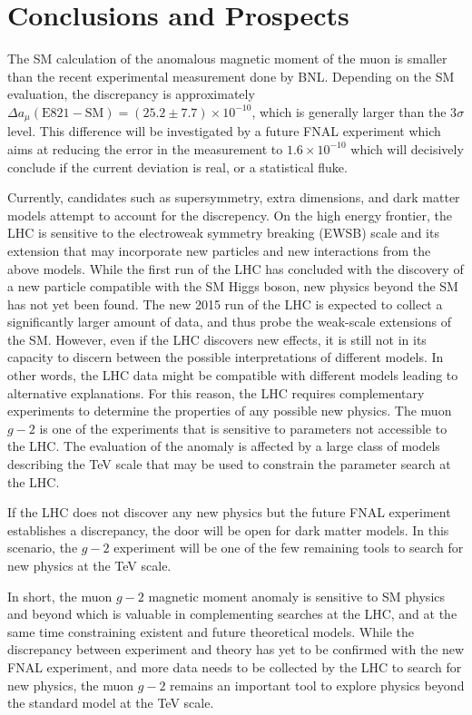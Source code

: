 \documentclass{outhesis}
\begin{document}
\section{Conclusions and Prospects}
\label{fut}
The SM calculation of the anomalous magnetic moment of the muon is smaller than the recent experimental measurement done by BNL. Depending on the SM evaluation, the discrepancy is approximately $\Delta a_{\mu} \left(\text{E821} - \text{SM}\right) = \left(25.2\pm7.7\right)\times 10^{-10}$, which is generally larger than the 3$\sigma$ level. This difference will be investigated by a future FNAL experiment which aims at reducing the error in the measurement to $1.6\times10^{-10}$ which will decisively conclude if the current deviation is real, or a statistical fluke. 

Currently, candidates such as supersymmetry, extra dimensions, and dark matter models attempt to account for the discrepency. On the high energy frontier, the LHC is sensitive to the electroweak symmetry breaking (EWSB) scale and its extension that may incorporate new particles and new interactions from the above models. While the first run of the LHC has concluded with the discovery of a new particle compatible with the SM Higgs boson, new physics beyond the SM has not yet been found. The new 2015 run of the LHC is expected to collect a significantly larger amount of data, and thus probe the weak-scale extensions of the SM. However, even if the LHC discovers new effects, it is still not in its capacity to discern between the possible interpretations of different models. In other words, the LHC data might be compatible with different models leading to alternative explanations. For this reason, the LHC requires complementary experiments to determine the properties of any possible new physics. The muon $g-2$ is one of the experiments that is sensitive to parameters not accessible to the LHC. The evaluation of the anomaly is affected by a large class of models describing the TeV scale that may be used to constrain the parameter search at the LHC.
 
If the LHC does not discover any new physics but the future FNAL experiment establishes a discrepancy, the door will be open for dark matter models. In this scenario, the $g-2$ experiment will be one of the few remaining tools to search for new physics at the TeV scale.

In short, the muon $g-2$ magnetic moment anomaly is sensitive to SM physics and beyond which is valuable in complementing searches at the LHC, and at the same time constraining existent and future theoretical models. While the discrepancy between experiment and theory has yet to be confirmed with the new FNAL experiment, and more data needs to be collected by the LHC to search for new physics, the muon $g-2$ remains an important tool to explore physics beyond the standard model at the TeV scale.
\end{document}

